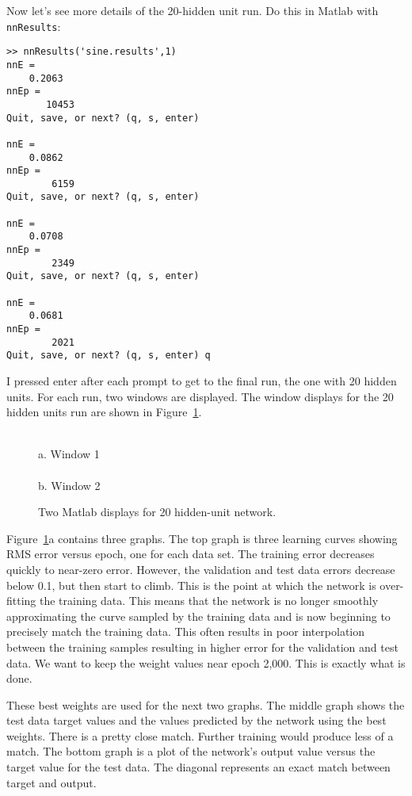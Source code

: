 Now let's see more details of the 20-hidden unit run.  Do this in Matlab with
\verb'nnResults':
\begin{verbatim}
>> nnResults('sine.results',1)
nnE =
    0.2063
nnEp =
       10453
Quit, save, or next? (q, s, enter) 

nnE =
    0.0862
nnEp =
        6159
Quit, save, or next? (q, s, enter) 

nnE =
    0.0708
nnEp =
        2349
Quit, save, or next? (q, s, enter) 
 
nnE =
    0.0681
nnEp =
        2021
Quit, save, or next? (q, s, enter) q
\end{verbatim}
I pressed enter after each prompt to get to the final run, the one with 20
hidden units.  For each run, two windows are displayed.  The window 
displays for the 20 
hidden units run are shown in Figure~\ref{fig:results}.
\begin{figure}
\begin{center}
 \\ a. Window 1 \\[15mm]
 \\ b. Window 2
\end{center}
\caption{Two Matlab displays for 20 hidden-unit network.}
\label{fig:results}
\end{figure}
Figure~\ref{fig:results}a contains three graphs.  The top graph is three
learning curves showing RMS error versus epoch, one for each data set.  The
training error decreases  quickly to near-zero error.  However, the validation
and test data errors decrease below 0.1, but then start to climb.  This is the
point at which the network is over-fitting the training data.  This means that
the network is no longer smoothly approximating the curve sampled by the
training data and is now beginning to precisely match the training data.  This
often results in poor interpolation between the training samples resulting in
higher error for the validation and test data.  We want to keep the weight
values near epoch 2,000.  This is exactly what is done.

These best weights are used for the next two graphs.  The middle graph shows
the test data target values and the values predicted by the network using the
best weights.  There is a pretty close match. Further training would produce
less of a match.  The bottom graph  is a plot of the network's output value
versus the target value for the test data.  The diagonal represents an exact
match between target and output.

